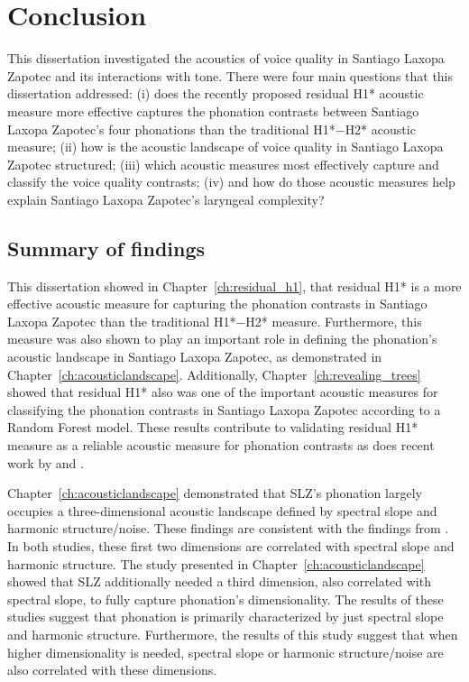 \chapter{Conclusion} \label{ch:conclusion}


This dissertation investigated the acoustics of voice quality in Santiago Laxopa Zapotec and its interactions with tone. There were four main questions that this dissertation addressed: (i) does the recently proposed residual H1* acoustic measure more effective captures the phonation contrasts between Santiago Laxopa Zapotec's four phonations than the traditional H1*$-$H2* acoustic measure; (ii) how is the acoustic landscape of voice quality in Santiago Laxopa Zapotec structured; (iii) which acoustic measures most effectively capture and classify the voice quality contrasts; (iv) and how do those acoustic measures help explain Santiago Laxopa Zapotec's laryngeal complexity? 

\section{Summary of findings}\label{sec:summary_of_findings}

This dissertation showed in Chapter~\ref{ch:residual_h1}, that  residual H1* is a more effective acoustic measure for capturing the phonation contrasts in Santiago Laxopa Zapotec than the traditional H1*$-$H2* measure. Furthermore, this measure was also shown to play an important role in defining the phonation's acoustic landscape in Santiago Laxopa Zapotec, as demonstrated in Chapter~\ref{ch:acousticlandscape}. Additionally, Chapter~\ref{ch:revealing_trees} showed that residual H1* also was one of the important acoustic measures for classifying the phonation contrasts in Santiago Laxopa Zapotec according to a Random Forest model. These results contribute to validating  residual H1* measure as a reliable acoustic measure for phonation contrasts as does recent work by \citet{chaiPhoneticsGlottalizedPhonations2023} and \citet{garellekMarginsPhonologyPhonetics2025}. 

Chapter~\ref{ch:acousticlandscape} demonstrated that SLZ's phonation largely occupies a three-dimensional acoustic landscape defined by spectral slope and harmonic structure/noise. These findings are consistent with the findings from \citet{keatingCrosslanguageAcousticSpace2023}. In both studies, these first two dimensions are correlated with spectral slope and harmonic structure. The study presented in Chapter~\ref{ch:acousticlandscape} showed that SLZ additionally needed a third dimension, also correlated with spectral slope, to fully capture phonation's dimensionality. The results of these studies suggest that phonation is primarily characterized by just spectral slope and harmonic structure. Furthermore, the results of this study suggest that when higher dimensionality is needed, spectral slope or harmonic structure/noise are also correlated with these dimensions.

